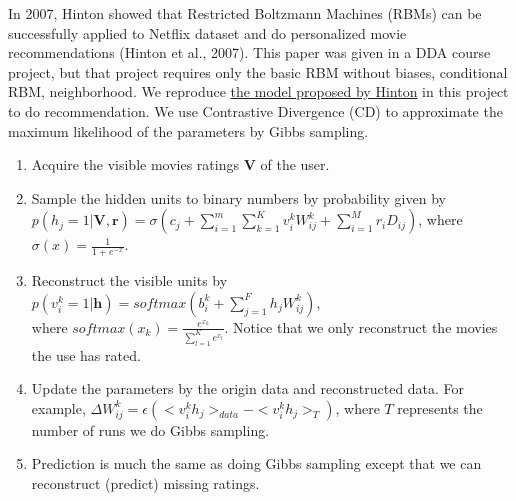 \begin{CJK*}{UTF8}{gbsn}
In 2007, Hinton showed that Restricted Boltzmann Machines (RBMs) can be successfully applied to Netflix dataset and do personalized movie recommendations (Hinton et al., 2007). This paper was given in a DDA course project, but that project requires only the basic RBM without biases, conditional RBM, neighborhood. We reproduce \hyperref[RBM]{the model proposed by Hinton} in this project to do recommendation. We use Contrastive Divergence (CD) to approximate the maximum likelihood of the parameters by Gibbs sampling.
\begin{enumerate}
    \item Acquire the visible movies ratings $ \bm{V} $ of the user.
    \item Sample the hidden units to binary numbers by probability given by \\ $ p(h_j = 1 | \bm{V}, \bm{r}) = \sigma(c_j + \sum_{i = 1}^m \sum_{k = 1}^K v_i^k W_{ij}^k + \sum_{i = 1}^M r_i D_{ij}) $, where $ \sigma(x) = \frac{1}{1 + e^{-x}}  $.
    \item Reconstruct the visible units by $ p(v_i^k = 1 | \bm{h}) = softmax(b_i^k + \sum_{j = 1}^F h_j W_{ij}^k) $, \\where $ softmax(x_k) = \frac{e^{x_k}}{\sum_{l= 1}^K e^{x_l}} $. Notice that we only reconstruct the movies the use has rated.
    \item Update the parameters by the origin data and reconstructed data. For example, $ \Delta W_{ij}^k = \epsilon (<v_i^k h_j>_{data} - <v_i^k h_j>_T) $, where $ T $ represents the number of runs we do Gibbs sampling.
    \item Prediction is much the same as doing Gibbs sampling except that we can reconstruct (predict) missing ratings.
\end{enumerate}


\end{CJK*}
